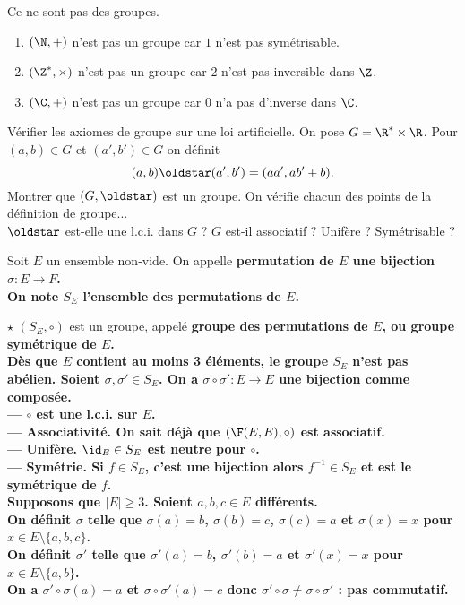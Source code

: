 \documentclass[11pt]{article}
\begin{document}
\begin{ex}{Ce ne sont pas des groupes.}{}
    \begin{enumerate}
        \item $(\N,+)$ n'est pas un groupe car $1$ n'est pas symétrisable.
        \item $(\Z^*,\times)$ n'est pas un groupe car $2$ n'est pas inversible dans $\Z$.
        \item $(\C,+)$ n'est pas un groupe car $0$ n'a pas d'inverse dans $\C$.
    \end{enumerate}
\end{ex}

\begin{ex}{Vérifier les axiomes de groupe sur une loi artificielle.}{}
    On pose $G=\R^*\times\R$. Pour $(a,b)\in G$ et $(a',b')\in G$ on définit
    \begin{equation*}
        (a,b)\s(a',b')=(aa',ab'+b).
    \end{equation*}
    Montrer que $(G,\s)$ est un groupe.
    \tcblower
    On vérifie chacun des points de la définition de groupe...\\
    $\s$ est-elle une l.c.i. dans $G$ ? $G$ est-il associatif ? Unifère ? Symétrisable ? 
\end{ex}

\begin{defi}{}{}
    Soit $E$ un ensemble non-vide. On appelle \bf{permutation} de $E$ une bijection $\sigma:E\to F$.\\
    On note $S_E$ l'ensemble des permutations de $E$.
\end{defi}

\begin{prop}{$\star$}{}
    $(S_E,\circ)$ est un groupe, appelé \bf{groupe des permutations} de $E$, ou groupe symétrique de $E$.\\
    Dès que $E$ contient au moins 3 éléments, le groupe $S_E$ n'est pas abélien.
    \tcblower
    Soient $\sigma,\sigma'\in S_E$. On a $\sigma\circ\sigma':E\to E$ une bijection comme composée.\\
    --- $\circ$ est une l.c.i. sur $E$.\\
    --- \bf{Associativité.} On sait déjà que $(\F(E,E), \circ)$ est associatif.\\
    --- \bf{Unifère.} $\id_E\in S_E$ est neutre pour $\circ$.\\
    --- \bf{Symétrie.} Si $f\in S_E$, c'est une bijection alors $f^{-1}\in S_E$ et est le symétrique de $f$.\\
    Supposons que $|E|\geq3$. Soient $a,b,c\in E$ différents.\\
    On définit $\sigma$ telle que $\sigma(a)=b$, $\sigma(b)=c$, $\sigma(c)=a$ et $\sigma(x)=x$ pour $x\in E\setminus\{a,b,c\}$.\\
    On définit $\sigma'$ telle que $\sigma'(a)=b$, $\sigma'(b)=a$ et $\sigma'(x)=x$ pour $x\in E\setminus\{a,b\}$.\\
    On a $\sigma'\circ\sigma(a)=a$ et $\sigma\circ\sigma'(a)=c$ donc $\sigma'\circ\sigma\neq\sigma\circ\sigma'$ : pas commutatif.
\end{prop}
\end{document}
